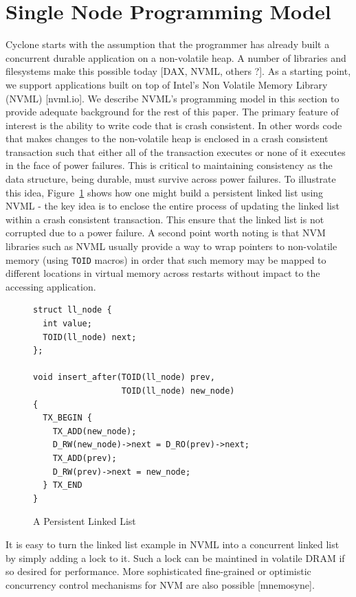 \documentclass[letterpaper,twocolumn,10pt]{article}
\begin{document}
\section{Single Node Programming Model}
Cyclone starts with the assumption that the programmer has already built a
concurrent durable application on a non-volatile heap. A number of libraries and
filesystems make this possible today [DAX, NVML, others ?]. As a starting point,
we support applications built on top of Intel's Non Volatile Memory Library
(NVML) [nvml.io]. We describe NVML's programming model in this section to
provide adequate background for the rest of this paper. The primary feature of
interest is the ability to write code that is crash consistent. In other words
code that makes changes to the non-volatile heap is enclosed in a crash
consistent transaction such that either all of the transaction executes or none
of it executes in the face of power failures. This is critical to maintaining
consistency as the data structure, being durable, must survive across power
failures. To illustrate this idea, Figure~\ref{fig:example} shows how one might
build a persistent linked list using NVML - the key idea is to enclose the
entire process of updating the linked list within a crash consistent
transaction. This ensure that the linked list is not corrupted due to a power
failure. A second point worth noting is that NVM libraries such as NVML usually
provide a way to wrap pointers to non-volatile memory (using {\tt TOID} macros)
in order that such memory may be mapped to different locations in virtual memory
across restarts without impact to the accessing application.

\begin{figure}
  { \scriptsize
\begin{verbatim}
struct ll_node {
  int value;
  TOID(ll_node) next;
};

void insert_after(TOID(ll_node) prev, 
                  TOID(ll_node) new_node)
{
  TX_BEGIN {
    TX_ADD(new_node);
    D_RW(new_node)->next = D_RO(prev)->next;
    TX_ADD(prev);
    D_RW(prev)->next = new_node;
  } TX_END
}

\end{verbatim}
  }
\caption{A Persistent Linked List}
\label{fig:example}
\end{figure}

It is easy to turn the linked list example in NVML into a concurrent linked list
by simply adding a lock to it. Such a lock can be maintined in volatile DRAM if
so desired for performance. More sophisticated fine-grained or optimistic
concurrency control mechanisms for NVM are also possible [mnemosyne].
\end{document}
